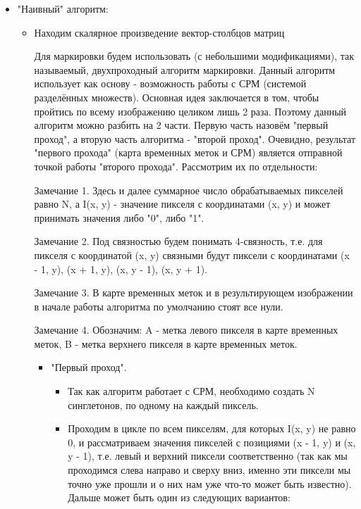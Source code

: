 \documentclass{report}
\begin{document}
		\begin{itemize}
			\item "Наивный"{} алгоритм:
			\begin{itemize}
				\item Находим скалярное произведение вектор-столбцов матриц 






 Для маркировки будем использовать (с небольшими модификациями), так называемый, двухпроходный алгоритм маркировки. Данный алгоритм использует как основу - возможность работы с СРМ (системой разделённых множеств). Основная идея заключается в том, чтобы пройтись по всему изображению целиком лишь 2 раза. Поэтому данный алгоритм можно разбить на 2 части. Первую часть назовём "первый проход"{}, а вторую часть алгоритма - "второй проход"{}. Очевидно, результат "первого прохода"{} (карта временных меток и СРМ) является отправной точкой работы "второго прохода"{}. Рассмотрим их по отдельности:
		\par Замечание 1. Здесь и далее суммарное число обрабатываемых пикселей равно N, а I(x, y) - значение пикселя с координатами (x, y) и может принимать значения либо "0"{}, либо "1"{}.
		\par Замечание 2. Под связностью будем понимать 4-связность, т.е. для пикселя с координатой (x, y) связными будут пиксели с координатами (x - 1, y), (x + 1, y), (x, y - 1), (x, y + 1).
		\par Замечание 3. В карте временных меток и в результирующем изображении в начале работы алгоритма по умолчанию стоят все нули.
		\par Замечание 4. Обозначим: A - метка левого пикселя в карте временных меток, B - метка верхнего пикселя в карте временных меток.
		\begin{itemize}
			\item "Первый проход"{}.
			\begin{itemize}
				\item Так как алгоритм работает с СРМ, необходимо создать N синглетонов, по одному на каждый пиксель.
				\item Проходим в цикле по всем пикселям, для которых I(x, y) не равно 0, и рассматриваем значения пикселей с позициями (x - 1, y) и (x, y - 1), т.е. левый и верхний пиксели соответственно (так как мы проходимся слева направо и сверху вниз, именно эти пиксели мы точно уже прошли и о них нам уже что-то может быть известно). Дальше может быть один из следующих вариантов:
				\begin{enumerate}

\end{enumerate}
\end{itemize}
\end{itemize}
\end{itemize}
\end{itemize}
\end{document}
